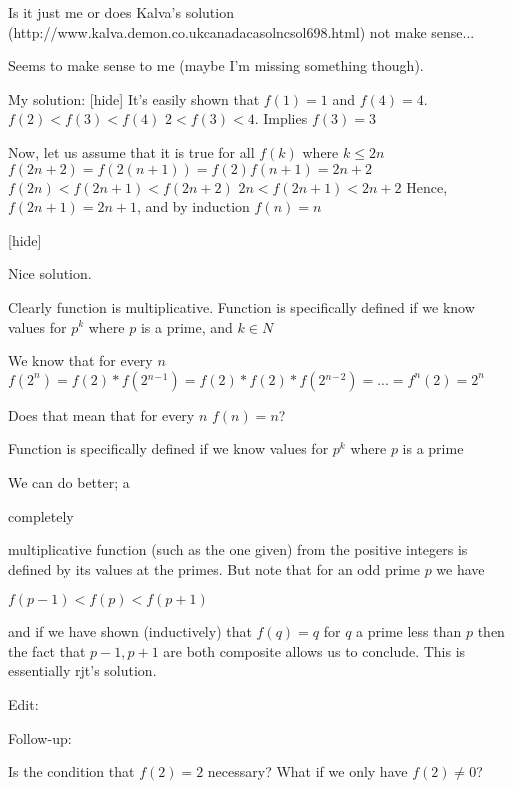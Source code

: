 \begin{solution}
	\begin{tcolorbox}Is it just me or does Kalva's solution (http://www.kalva.demon.co.uk\/canada\/casoln\/csol698.html) not make sense...\end{tcolorbox}

Seems to make sense to me (maybe I'm missing something though).

My solution:
[hide]
It's easily shown that $f(1)=1$ and $f(4)=4$. 
$f(2)<f(3)<f(4)$
$2 < f(3) < 4$. Implies $f(3) = 3$

Now, let us assume that it is true for all $f(k)$ where $k\leq 2n$  
$f(2n+2)=f(2(n+1))=f(2)f(n+1)=2n+2$
$f(2n)<f(2n+1)<f(2n+2)$
$2n<f(2n+1)<2n+2$
Hence, $f(2n+1)=2n+1$, and by induction $f(n) = n$


[\/hide]
\end{solution}



\begin{solution}
	Nice solution.
\end{solution}



\begin{solution}
	Clearly function is multiplicative.
Function is specifically defined  if we know values for $ p^k$ where $ p$ is a prime, and
 $ k\in N$

We know that for every $ n$ $ f(2^n)=f(2)*f(2{}^n{}^-{}^1)=f(2)*f(2)*f(2{}^n{}^-{}^2)=...=f^n(2)=2^n$

Does that mean that for every $ n$ $ f(n)=n$?
\end{solution}



\begin{solution}
	\begin{tcolorbox}Function is specifically defined  if we know values for $ p^k$ where $ p$ is a prime\end{tcolorbox}

We can do better; a \begin{italicized}completely\end{italicized} multiplicative function (such as the one given) from the positive integers is defined by its values at the primes.  But note that for an odd prime $ p$ we have

$ f(p - 1) < f(p) < f(p + 1)$

and if we have shown (inductively) that $ f(q) = q$ for $ q$ a prime less than $ p$ then the fact that $ p - 1, p + 1$ are both composite allows us to conclude.  This is essentially rjt's solution.

Edit:  \begin{bolded}Follow-up:\end{bolded}  Is the condition that $ f(2) = 2$ necessary?  What if we only have $ f(2) \neq 0$?
\end{solution}



